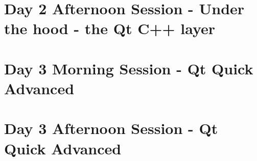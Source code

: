 \documentclass[t]{beamer}
\begin{document}
\part{Day 2 Afternoon Session - Under the hood - the Qt C++ layer}


\part{Day 3 Morning Session - Qt Quick Advanced}



\part{Day 3 Afternoon Session - Qt Quick Advanced}


%


\end{document}
